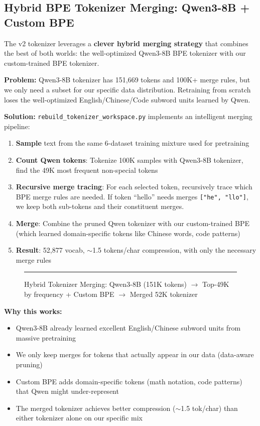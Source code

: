 \subsection{Hybrid BPE Tokenizer Merging: Qwen3-8B + Custom BPE}

The v2 tokenizer leverages a \textbf{clever hybrid merging strategy} that combines the best of both worlds: the well-optimized Qwen3-8B BPE tokenizer with our custom-trained BPE tokenizer.

\textbf{Problem:} Qwen3-8B tokenizer has 151,669 tokens and 100K+ merge rules, but we only need a subset for our specific data distribution. Retraining from scratch loses the well-optimized English/Chinese/Code subword units learned by Qwen.

\textbf{Solution:} \texttt{rebuild\_tokenizer\_workspace.py} implements an intelligent merging pipeline:

\begin{enumerate}
    \item \textbf{Sample} text from the same 6-dataset training mixture used for pretraining
    \item \textbf{Count Qwen tokens}: Tokenize 100K samples with Qwen3-8B tokenizer, find the 49K most frequent non-special tokens
    \item \textbf{Recursive merge tracing}: For each selected token, recursively trace which BPE merge rules are needed. If token ``hello'' needs merges \texttt{["he", "llo"]}, we keep both sub-tokens and their constituent merges.
    \item \textbf{Merge}: Combine the pruned Qwen tokenizer with our custom-trained BPE (which learned domain-specific tokens like Chinese words, code patterns)
    \item \textbf{Result}: 52,877 vocab, $\sim$1.5 tokens/char compression, with only the necessary merge rules
\end{enumerate}

\begin{figure}[h]
    \centering
    \rule{0.8\textwidth}{0.2\textwidth}
    \caption{Hybrid Tokenizer Merging: Qwen3-8B (151K tokens) $\rightarrow$ Top-49K by frequency + Custom BPE $\rightarrow$ Merged 52K tokenizer}
    \label{fig:tokenizer}
\end{figure}

\textbf{Why this works:}
\begin{itemize}
    \item Qwen3-8B already learned excellent English/Chinese subword units from massive pretraining
    \item We only keep merges for tokens that actually appear in our data (data-aware pruning)
    \item Custom BPE adds domain-specific tokens (math notation, code patterns) that Qwen might under-represent
    \item The merged tokenizer achieves better compression ($\sim$1.5 tok/char) than either tokenizer alone on our specific mix
\end{itemize}

